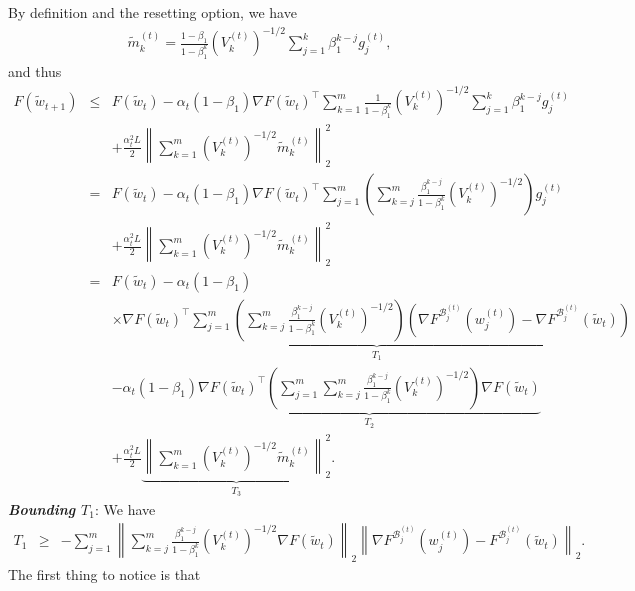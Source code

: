 \documentclass[twoside]{article}
\def\BB{\mathcal{B}}
\begin{document}
By definition and the resetting option, we have
\begin{eqnarray}
\widetilde m_k^{(t)} = \frac{1-\beta_1}{1-\beta_1^k} \left(V_k^{(t)}\right)^{-1/2} \sum_{j=1}^k \beta_1^{k-j} g_j^{(t)}\nonumber,
\end{eqnarray}
and thus
\begin{eqnarray}
F(\widetilde w_{t+1})&\leq& F(\widetilde w_t) - \alpha_t(1-\beta_1) \nabla F(\widetilde w_t)^{\top}\sum_{k=1}^{m}\frac{1}{1-\beta_1^{k}} \left(V_k^{(t)}\right)^{-1/2} \sum_{j=1}^k \beta_1^{k-j} g_j^{(t)}\nonumber\\
&&+ \frac{\alpha_t^2L}{2}\left\|\sum_{k=1}^{m}\left(V_k^{(t)}\right)^{-1/2} \widetilde m_k^{(t)}\right\|_2^2\nonumber\\ 
&=&  F(\widetilde w_t) - \alpha_t (1-\beta_1)\nabla F(\widetilde w_t)^{\top}\sum_{j=1}^{m} \left(\sum_{k=j}^{m} \frac{\beta_1^{k-j}}{1-\beta_1^k} \left(V_k^{(t)}\right)^{-1/2}\right) g_j^{(t)} 
\nonumber\\
&& +  \frac{\alpha_t^2L}{2}\left\|\sum_{k=1}^{m} \left(V_k^{(t)}\right)^{-1/2} \widetilde m_k^{(t)}\right\|_2^2\nonumber\\
&=& F(\widetilde w_t) -\alpha_t (1-\beta_1)\nonumber\\
&&\times \underbrace{\nabla F(\widetilde w_t)^{\top}\sum_{j=1}^{m} \left(\sum_{k=j}^{m} \frac{\beta_1^{k-j}}{1-\beta_1^k} \left(V_k^{(t)}\right)^{-1/2}\right) \left(\nabla F^{\BB^{(t)}_j}\left(w_j^{(t)}\right) - \nabla F^{\BB^{(t)}_j} \left(\widetilde w_t\right)\right)}_{T_1} \nonumber\\
&& - \alpha_t(1-\beta_1) \underbrace{\nabla F(\widetilde w_t)^{\top}\left(\sum_{j=1}^{m} \sum_{k=j}^{m} \frac{\beta_1^{k-j}}{1-\beta_1^k} \left(V_k^{(t)}\right)^{-1/2}\right) \nabla F(\widetilde w_t)}_{T_2}\nonumber\\
&& +  \frac{\alpha_t^2L}{2}\underbrace{\left\|\sum_{k=1}^{m} \left(V_k^{(t)}\right)^{-1/2} \widetilde m_k^{(t)}\right\|_2^2}_{T_3} .\nonumber
\end{eqnarray}
\textbf{\emph{Bounding $T_1$}}: We have
\begin{eqnarray}
\label{T10}
T_1 &\geq& -  \sum_{j=1}^{m} \left\| \sum_{k=j}^{m} \frac{\beta_1^{k-j}}{1-\beta_1^k} \left(V_k^{(t)}\right)^{-1/2}\nabla F(\widetilde w_t)\right\|_2\left\|\nabla F^{\BB^{(t)}_j}\left(w_j^{(t)}\right) - F^{\BB^{(t)}_j}(\widetilde w_t)\right\|_2.
\end{eqnarray}
The first thing to notice is that 
\end{document}

